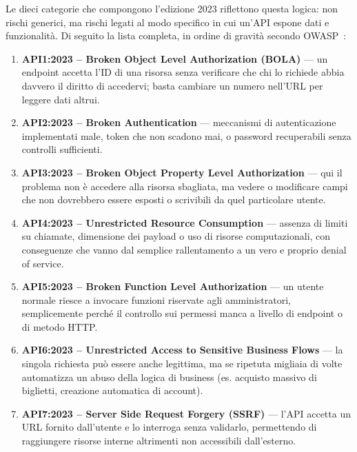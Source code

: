 Le dieci categorie che compongono l'edizione 2023 riflettono questa logica: non
rischi generici, ma rischi legati al modo specifico in cui un'API espone dati e
funzionalità. Di seguito la lista completa, in ordine di gravità
secondo OWASP~\cite{owasp2023apitop10}:
\begin{enumerate}
  \item \textbf{API1:2023 -- Broken Object Level Authorization (BOLA)} — un
    endpoint accetta l'ID di una risorsa senza verificare che chi lo richiede
    abbia davvero il diritto di accedervi; basta cambiare un numero nell'URL
    per leggere dati altrui.

  \item \textbf{API2:2023 -- Broken Authentication} — meccanismi di
    autenticazione implementati male, token che non scadono mai, o password
    recuperabili senza controlli sufficienti.

  \item \textbf{API3:2023 -- Broken Object Property Level Authorization} —
    qui il problema non è accedere alla risorsa sbagliata, ma vedere o
    modificare campi che non dovrebbero essere esposti o scrivibili da quel
    particolare utente.

  \item \textbf{API4:2023 -- Unrestricted Resource Consumption} — assenza di
    limiti su chiamate, dimensione dei payload o uso di risorse computazionali,
    con conseguenze che vanno dal semplice rallentamento a un vero e proprio
    denial of service.

  \item \textbf{API5:2023 -- Broken Function Level Authorization} — un
    utente normale riesce a invocare funzioni riservate agli amministratori,
    semplicemente perché il controllo sui permessi manca a livello di endpoint
    o di metodo HTTP.

  \item \textbf{API6:2023 -- Unrestricted Access to Sensitive Business
    Flows} — la singola richiesta può essere anche legittima, ma se ripetuta
    migliaia di volte automatizza un abuso della logica di business (es.
    acquisto massivo di biglietti, creazione automatica di account).

  \item \textbf{API7:2023 -- Server Side Request Forgery (SSRF)} — l'API
    accetta un URL fornito dall'utente e lo interroga senza validarlo,
    permettendo di raggiungere risorse interne altrimenti non accessibili
    dall'esterno.


\end{enumerate}
